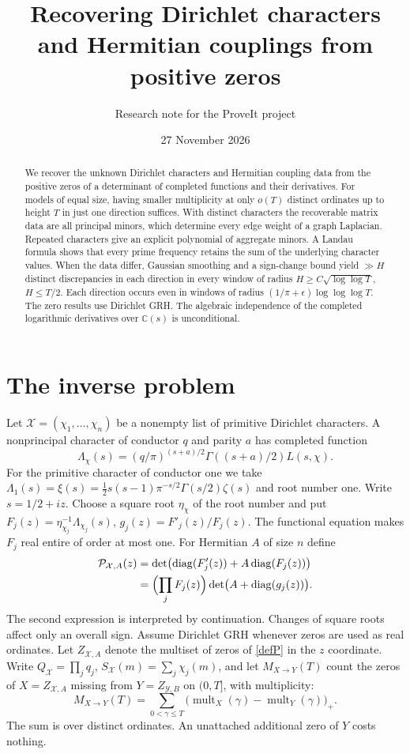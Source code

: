\documentclass[11pt]{article}
\title{Recovering Dirichlet characters and Hermitian couplings from positive zeros}
\author{Research note for the ProveIt project}
\date{27 November 2026}
\newcommand{\CC}{\mathbb C}
\newcommand{\diag}{\operatorname{diag}}
\newcommand{\cX}{\mathcal X}
\newcommand{\cY}{\mathcal Y}
\newcommand{\PP}{\mathcal P}
\begin{document}
\maketitle
\begin{abstract}
We recover the unknown Dirichlet characters and Hermitian coupling data from the positive zeros of a determinant of completed functions and their derivatives. For models of equal size, having smaller multiplicity at only $o(T)$ distinct ordinates up to height $T$ in just one direction suffices. With distinct characters the recoverable matrix data are all principal minors, which determine every edge weight of a graph Laplacian. Repeated characters give an explicit polynomial of aggregate minors. A Landau formula shows that every prime frequency retains the sum of the underlying character values. When the data differ, Gaussian smoothing and a sign-change bound yield $\gg H$ distinct discrepancies in each direction in every window of radius $H\ge C\sqrt{\log\log T}$, $H\le T/2$. Each direction occurs even in windows of radius $(1/\pi+\epsilon)\log\log\log T$. The zero results use Dirichlet GRH. The algebraic independence of the completed logarithmic derivatives over $\CC(s)$ is unconditional.
\end{abstract}

\section{The inverse problem}
Let $\cX=(\chi_1,\ldots,\chi_n)$ be a nonempty list of primitive Dirichlet characters. A nonprincipal character of conductor $q$ and parity $a$ has completed function
\[
 \Lambda_\chi(s)=(q/\pi)^{(s+a)/2}\Gamma((s+a)/2)L(s,\chi).
\]
For the primitive character of conductor one we take $\Lambda_1(s)=\xi(s)=\frac12s(s-1)\pi^{-s/2}\Gamma(s/2)\zeta(s)$ and root number one. Write $s=1/2+iz$. Choose a square root $\eta_\chi$ of the root number and put $F_j(z)=\eta_{\chi_j}^{-1}\Lambda_{\chi_j}(s)$, $g_j(z)=F'_j(z)/F_j(z)$. The functional equation makes $F_j$ real entire of order at most one. For Hermitian $A$ of size $n$ define
\begin{align}
 \PP_{\cX,A}(z)
 &=\det\bigl(\diag(F'_j(z))+A\diag(F_j(z))\bigr) \label{defP}\\
 &=\Bigl(\prod_jF_j(z)\Bigr)\det\bigl(A+\diag(g_j(z))\bigr). \nonumber
\end{align}
The second expression is interpreted by continuation. Changes of square roots affect only an overall sign. Assume Dirichlet GRH whenever zeros are used as real ordinates. Let $Z_{\cX,A}$ denote the multiset of zeros of \eqref{defP} in the $z$ coordinate. Write $Q_{\cX}=\prod_jq_j$, $S_{\cX}(m)=\sum_j\chi_j(m)$, and let $M_{X\to Y}(T)$ count the zeros of $X=Z_{\cX,A}$ missing from $Y=Z_{\cY,B}$ on $(0,T]$, with multiplicity:
\[
 M_{X\to Y}(T)=\sum_{0<\gamma\le T}
    \bigl(\operatorname{mult}_X(\gamma)-\operatorname{mult}_Y(\gamma)\bigr)_+ .
\]
The sum is over distinct ordinates. An unattached additional zero of $Y$ costs nothing.
\end{document}
